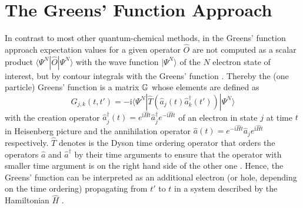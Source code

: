 {\section{The Greens' Function Approach}
\label{ch:gf}
In contrast to most other quantum-chemical methods, in the Greens' function approach expectation values for a given operator $\hat{O}$ are not computed as a scalar product $\langle \Psi^N |\hat{O} | \Psi^N \rangle $ with the wave function $|\Psi^N\rangle$ of the $N$ electron state of interest, but by contour integrals with the Greens' function \cite{bookGF, 1pGFcederbaum}.
Thereby the (one particle) Greens' function is a matrix $\mathbb{G}$ whose elements are defined as
\begin{equation} \label{eq:defGF}
G_{j,k}(t,t')= -\text{i}\langle \Psi^N | \hat{T}\left(\hat{a}_j(t)\hat{a}_k^\dagger(t')\right)|\Psi^N\rangle 
\end{equation}
with the creation operator $\hat{a}^\dagger_j (t)=e^{\text{i}\hat{H}t}\hat{a}^\dagger_j e^{-\text{i}\hat{H}t}$ of an electron in state $j$ at time $t$ in Heisenberg picture and the annihilation operator $\hat{a}(t)=e^{-\text{i}\hat{H}t}\hat{a}_j e^{\text{i}\hat{H}t}$ respectively.
$\hat{T}$ denotes is the Dyson time ordering operator that orders the operators $\hat{a}$ and $\hat{a}^\dagger$ by their time arguments to ensure that the operator with smaller time argument is on the right hand side of the other one \cite{bookGF}.
Hence, the Greens' function can be interpreted as an additional electron (or hole, depending on the time ordering) propagating from $t'$ to $t$ in a system described by the Hamiltonian $\hat{H}$ \cite{bookGF}.

}
